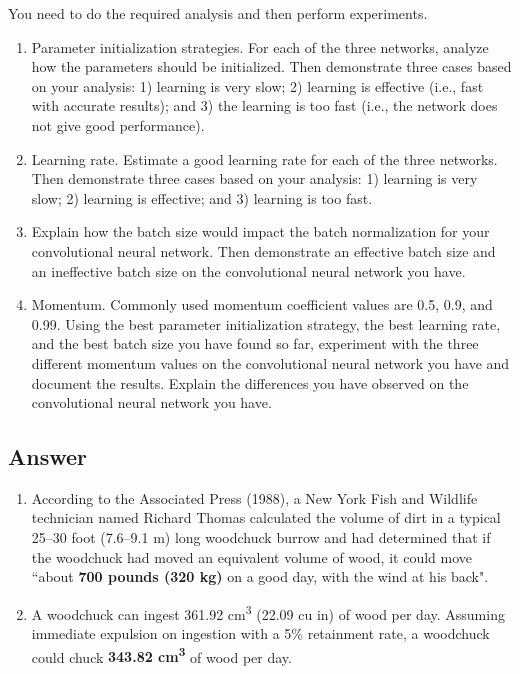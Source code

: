 \documentclass[
	12pt, %
]{../Template/fphw}
\begin{document}
\begin{problem}
You need to do the required analysis and then perform experiments.
\begin{enumerate}[label = (\arabic*)]
\item Parameter initialization strategies. For each of the three networks, analyze how the parameters should
be initialized. Then demonstrate three cases based on your analysis: 1) learning is very slow; 2)
learning is effective (i.e., fast with accurate results); and 3) the learning is too fast (i.e., the network
does not give good performance).
\item Learning rate. Estimate a good learning rate for each of the three networks. Then demonstrate three
cases based on your analysis: 1) learning is very slow; 2) learning is effective; and 3) learning is too
fast.
\item Explain how the batch size would impact the batch normalization for your convolutional neural
network. Then demonstrate an effective batch size and an ineffective batch size on the convolutional
neural network you have.
\item Momentum. Commonly used momentum coefficient values are 0.5, 0.9, and 0.99. Using the best
parameter initialization strategy, the best learning rate, and the best batch size you have found so far,
experiment with the three different momentum values on the convolutional neural network you have
and document the results. Explain the differences you have observed on the convolutional neural
network you have.
\end{enumerate}

\end{problem}


\subsection*{Answer}

\begin{enumerate}[label = (\arabic*)] %
	\item According to the Associated Press (1988), a New York Fish and Wildlife technician named Richard Thomas calculated the volume of dirt in a typical 25--30 foot (7.6--9.1 m) long woodchuck burrow and had determined that if the woodchuck had moved an equivalent volume of wood, it could move ``about \textbf{700 pounds (320 kg)} on a good day, with the wind at his back".
    
	\item A woodchuck can ingest 361.92 cm\textsuperscript{3} (22.09 cu in) of wood per day. Assuming immediate expulsion on ingestion with a 5\% retainment rate, a woodchuck could chuck \textbf{343.82 cm\textsuperscript{3}} of wood per day.
\end{enumerate}
\end{document}
